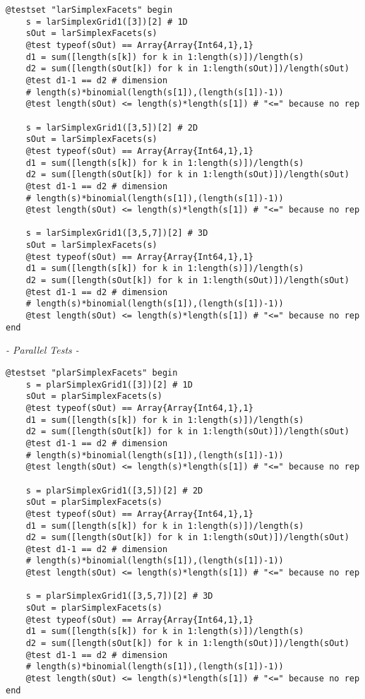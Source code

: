 \documentclass[a4paper,12pt,titlepage]{article}					%
\begin{document}
\begin{Verbatim}
@testset "larSimplexFacets" begin
	s = larSimplexGrid1([3])[2] # 1D
	sOut = larSimplexFacets(s)
	@test typeof(sOut) == Array{Array{Int64,1},1}
	d1 = sum([length(s[k]) for k in 1:length(s)])/length(s)
	d2 = sum([length(sOut[k]) for k in 1:length(sOut)])/length(sOut)
	@test d1-1 == d2 # dimension
	# length(s)*binomial(length(s[1]),(length(s[1])-1))
	@test length(sOut) <= length(s)*length(s[1]) # "<=" because no rep
	
	s = larSimplexGrid1([3,5])[2] # 2D
	sOut = larSimplexFacets(s)
	@test typeof(sOut) == Array{Array{Int64,1},1}
	d1 = sum([length(s[k]) for k in 1:length(s)])/length(s)
	d2 = sum([length(sOut[k]) for k in 1:length(sOut)])/length(sOut)
	@test d1-1 == d2 # dimension
	# length(s)*binomial(length(s[1]),(length(s[1])-1))
	@test length(sOut) <= length(s)*length(s[1]) # "<=" because no rep
	
	s = larSimplexGrid1([3,5,7])[2] # 3D
	sOut = larSimplexFacets(s)
	@test typeof(sOut) == Array{Array{Int64,1},1}
	d1 = sum([length(s[k]) for k in 1:length(s)])/length(s)
	d2 = sum([length(sOut[k]) for k in 1:length(sOut)])/length(sOut)
	@test d1-1 == d2 # dimension
	# length(s)*binomial(length(s[1]),(length(s[1])-1))
	@test length(sOut) <= length(s)*length(s[1]) # "<=" because no rep
end
\end{Verbatim}

\emph{- Parallel Tests -}

\begin{Verbatim}
@testset "plarSimplexFacets" begin
	s = plarSimplexGrid1([3])[2] # 1D
	sOut = plarSimplexFacets(s)
	@test typeof(sOut) == Array{Array{Int64,1},1}
	d1 = sum([length(s[k]) for k in 1:length(s)])/length(s)
	d2 = sum([length(sOut[k]) for k in 1:length(sOut)])/length(sOut)
	@test d1-1 == d2 # dimension
	# length(s)*binomial(length(s[1]),(length(s[1])-1))
	@test length(sOut) <= length(s)*length(s[1]) # "<=" because no rep
	
	s = plarSimplexGrid1([3,5])[2] # 2D
	sOut = plarSimplexFacets(s)
	@test typeof(sOut) == Array{Array{Int64,1},1}
	d1 = sum([length(s[k]) for k in 1:length(s)])/length(s)
	d2 = sum([length(sOut[k]) for k in 1:length(sOut)])/length(sOut)
	@test d1-1 == d2 # dimension
	# length(s)*binomial(length(s[1]),(length(s[1])-1))
	@test length(sOut) <= length(s)*length(s[1]) # "<=" because no rep
	
	s = plarSimplexGrid1([3,5,7])[2] # 3D
	sOut = plarSimplexFacets(s)
	@test typeof(sOut) == Array{Array{Int64,1},1}
	d1 = sum([length(s[k]) for k in 1:length(s)])/length(s)
	d2 = sum([length(sOut[k]) for k in 1:length(sOut)])/length(sOut)
	@test d1-1 == d2 # dimension
	# length(s)*binomial(length(s[1]),(length(s[1])-1))
	@test length(sOut) <= length(s)*length(s[1]) # "<=" because no rep
end
\end{Verbatim}
\end{document}

